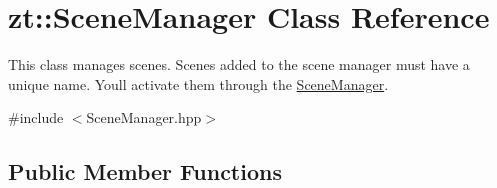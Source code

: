 \hypertarget{classzt_1_1_scene_manager}{}\section{zt\+:\+:Scene\+Manager Class Reference}
\label{classzt_1_1_scene_manager}


This class manages scenes. Scenes added to the scene manager must have a unique name. You\textquotesingle{}ll activate them through the \hyperlink{classzt_1_1_scene_manager}{Scene\+Manager}.  




{\ttfamily \#include $<$Scene\+Manager.\+hpp$>$}

\subsection*{Public Member Functions}
